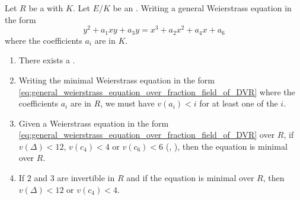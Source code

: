 \begin{lemma}
    Let $R$ be a  with  $K$. Let $E/K$ be an .
    Writing a general Weierstrass equation in the form
    \begin{equation} \label{eq:general_weierstrass_equation_over_fraction_field_of_DVR}
    y^2 + a_1 xy + a_3 y = x^3 + a_2 x^2 + a_4 x + a_6
    \end{equation}
    where the coefficients $a_i$ are in $K$.

    \begin{enumerate}
        \item There exists a . 

        \item Writing the minimal Weierstrass equation in the form \eqref{eq:general_weierstrass_equation_over_fraction_field_of_DVR} where the coefficients $a_i$ are in $R$, we must have $v(a_i) < i$ for at least one of the $i$. 

        \item Given a Weierstrass equation in the form \eqref{eq:general_weierstrass_equation_over_fraction_field_of_DVR} over $R$, if $v(\Delta) < 12$, $v(c_4) < 4$ or $v(c_6) < 6$ (, ), then the equation is minimal over $R$.

        \item If $2$ and $3$ are invertible in $R$ and if the equation is minimal over $R$, then $v(\Delta) < 12$ or $v(c_4) < 4$. 
    \end{enumerate}

\end{lemma}


